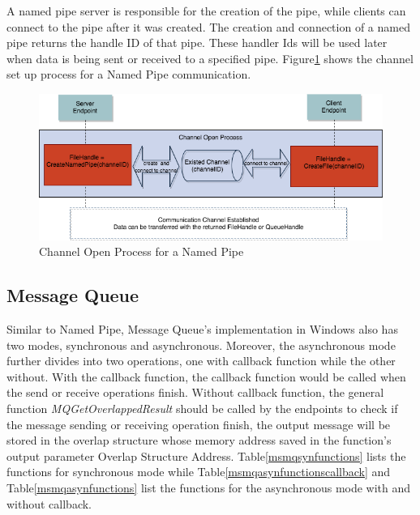 A named pipe server is responsible for the creation of the pipe, while clients can connect to the pipe after it was created. The creation and connection of a named pipe returns the handle ID of that pipe. These handler Ids will be used later when data is being sent or received to a specified pipe. Figure\ref{namedpipeopen} shows the channel set up process for a Named Pipe communication.
\begin{figure}[H]
\centerline{\includegraphics[scale=0.55]{Figures/namepipechannelopen}}
 \caption{Channel Open Process for a Named Pipe}
\label{namedpipeopen}
\end{figure}

\subsection{Message Queue}
Similar to Named Pipe, Message Queue's implementation in Windows also has two modes, synchronous and asynchronous. Moreover, the asynchronous mode further divides into two operations, one with callback function while the other without. With the callback function, the callback function would be called when the send or receive operations finish. Without callback function, the general function \textit{MQGetOverlappedResult} should be called by the endpoints to check if the message sending or receiving operation finish, the output message will be stored in the overlap structure whose memory address saved in the function's output parameter Overlap Structure Address. Table\ref{msmqsynfunctions} lists the functions for synchronous mode while Table\ref{msmqasynfunctionscallback} and Table\ref{msmqasynfunctions} list the functions for the asynchronous mode with and without callback. 

